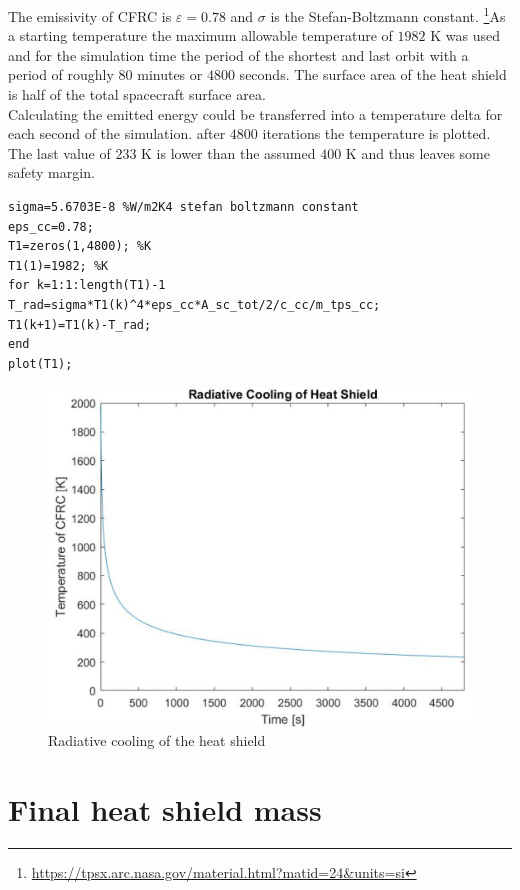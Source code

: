 The emissivity of CFRC is $\varepsilon = 0.78$ and $\sigma$ is the Stefan-Boltzmann constant. \footnote{\url{https://tpsx.arc.nasa.gov/material.html?matid=24\&units=si}}As a starting
temperature the maximum allowable temperature of $1982$ K was used and for the simulation time the
period of the shortest and last orbit with a period of roughly $80$ minutes or $4800$ seconds. The surface area of the heat shield is half of the total spacecraft surface area.\\

Calculating the emitted energy could be transferred into a temperature delta for each second of the
simulation. after $4800$ iterations the temperature is plotted. The last value of $233$ K is lower than the assumed $400$ K and thus leaves some safety margin.

\begin{verbatim}
sigma=5.6703E-8 %W/m2K4 stefan boltzmann constant
eps_cc=0.78;
T1=zeros(1,4800); %K
T1(1)=1982; %K
for k=1:1:length(T1)-1
T_rad=sigma*T1(k)^4*eps_cc*A_sc_tot/2/c_cc/m_tps_cc;
T1(k+1)=T1(k)-T_rad;
end
plot(T1);
\end{verbatim}
\begin{figure}[H]
	\centering\includegraphics[width=0.9\linewidth]{radcooling}
	\caption{Radiative cooling of the heat shield}
\end{figure}

\section{Final heat shield mass}

